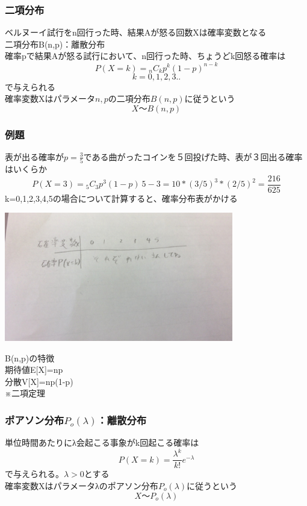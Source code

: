 \documentclass{jsarticle}
\begin{document}
	\subsubsection{二項分布}
		ベルヌーイ試行をn回行った時、結果Aが怒る回数Xは確率変数となる\\
		二項分布B(n,p)：離散分布\\
		確率pで結果Aが怒る試行において、n回行った時、ちょうどk回怒る確率は\\
		\[
			P(X=k)={}_nC_k p^k(1-p)^{n-k}
		\]
		\[k=0,1,2,3..\]
		で与えられる\\
		確率変数Xはパラメータ$n,p$の二項分布$B(n,p)$に従うという\\
		\[
			X〜B(n,p)
		\]
		\subsubsection{例題}
			表が出る確率が$p=\frac{3}{5}$である曲がったコインを５回投げた時、表が３回出る確率はいくらか\\
			\[
				P(X=3)={}_5C_3p^3(1-p)~{5-3}=10*(3/5)^3*(2/5)^2=\frac{216}{625}
			\]
			k=0,1,2,3,4,5の場合について計算すると、確率分布表がかける
			\begin{center}
				\includegraphics[width=10cm]{11_2_2.JPG}
			\end{center}
		
		B(n,p)の特徴\\
		期待値E[X]=np\\
		分散V[X]=np(1-p)\\
		※二項定理
			
		\subsubsection{ポアソン分布$P_o(λ)$：離散分布}
			単位時間あたりにλ会起こる事象がk回起こる確率は
			\[
				P(X=k)=\frac{λ^k}{k!}e^{-λ}
			\]
			で与えられる。$λ>0$とする\\
			確率変数Xはパラメータλのポアソン分布$P_o(λ)$に従うという
			\[
				X〜P_o(λ)
			\]
\end{document}
